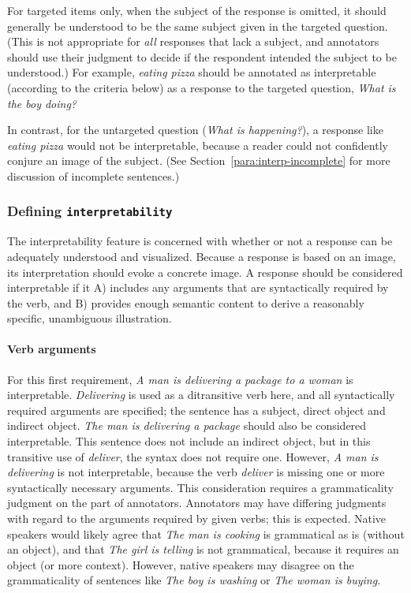 \documentclass[12pt,notitlepage]{article}
\newcommand{\feat}[1]{\texttt{#1}}
\begin{document}
For targeted items only, when the subject of the response is omitted, it should generally be understood to be the same subject given in the targeted question. (This is not appropriate for \textit{all} responses that lack a subject, and annotators should use their judgment to decide if the respondent intended the subject to be understood.) For example, \textit{eating pizza} should be annotated as interpretable (according to the criteria below) as a response to the targeted question, \textit{What is the boy doing?}

In contrast, for the untargeted question (\textit{What is happening?}), a response like \textit{eating pizza} would not be interpretable, because a reader could not confidently conjure an image of the subject. (See Section~\ref{para:interp-incomplete} for more discussion of incomplete sentences.)

\subsubsection{Defining \feat{interpretability}} The interpretability feature is concerned with whether or not a response can be adequately understood and visualized. Because a response is based on an image, its interpretation should evoke a concrete image. A response should be considered interpretable if it A) includes any arguments that are syntactically required by the verb, and B) provides enough semantic content to derive a reasonably specific, unambiguous illustration.

\paragraph{Verb arguments} \label{para:interp-arguments} For this first requirement, \textit{A man is delivering a package to a woman} is interpretable. \textit{Delivering} is used as a ditransitive verb here, and all syntactically required arguments are specified; the sentence has a subject, direct object and indirect object. \textit{The man is delivering a package} should also be considered interpretable. This sentence does not include an indirect object, but in this transitive use of \textit{deliver}, the syntax does not require one. However, \textit{A man is delivering} is not interpretable, because the verb \textit{deliver} is missing one or more syntactically necessary arguments. This consideration requires a grammaticality judgment on the part of annotators. Annotators may have differing judgments with regard to the arguments required by given verbs; this is expected. Native speakers would likely agree that \textit{The man is cooking} is grammatical as is (without an object), and that \textit{The girl is telling} is not grammatical, because it requires an object (or more context). However, native speakers may disagree on the grammaticality of sentences like \textit{The boy is washing} or \textit{The woman is buying}.
\end{document}
